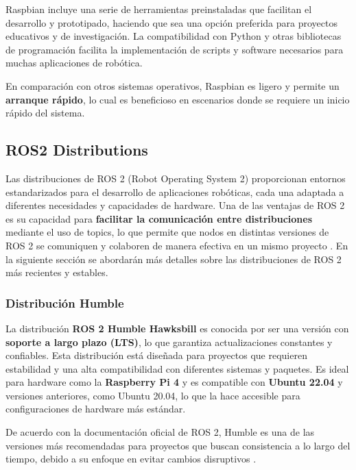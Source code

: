     Raspbian incluye una serie de herramientas preinstaladas que facilitan el desarrollo y prototipado, haciendo que sea una opción preferida para proyectos educativos y de investigación. La compatibilidad con Python y otras bibliotecas de programación facilita la implementación de scripts y software necesarios para muchas aplicaciones de robótica.

    En comparación con otros sistemas operativos, Raspbian es ligero y permite un \textbf{arranque rápido}, lo cual es beneficioso en escenarios donde se requiere un inicio rápido del sistema.


\subsection{ROS2 Distributions}
    Las distribuciones de ROS 2 (Robot Operating System 2) proporcionan entornos estandarizados para el desarrollo de aplicaciones robóticas, cada una adaptada a diferentes necesidades y capacidades de hardware. Una de las ventajas de ROS 2 es su capacidad para \textbf{facilitar la comunicación entre distribuciones} mediante el uso de topics, lo que permite que nodos en distintas versiones de ROS 2 se comuniquen y colaboren de manera efectiva en un mismo proyecto \cite{ros_docs}. En la siguiente sección se abordarán más detalles sobre las distribuciones de ROS 2 más recientes y estables.

    \subsubsection{Distribución Humble}

    La distribución \textbf{ROS 2 Humble Hawksbill} es conocida por ser una versión con \textbf{soporte a largo plazo (LTS)}, lo que garantiza actualizaciones constantes y confiables. Esta distribución está diseñada para proyectos que requieren estabilidad y una alta compatibilidad con diferentes sistemas y paquetes. Es ideal para hardware como la \textbf{Raspberry Pi 4} y es compatible con \textbf{Ubuntu 22.04} y versiones anteriores, como Ubuntu 20.04, lo que la hace accesible para configuraciones de hardware más estándar.
    
    De acuerdo con la documentación oficial de ROS 2, Humble es una de las versiones más recomendadas para proyectos que buscan consistencia a lo largo del tiempo, debido a su enfoque en evitar cambios disruptivos \cite{humble_documentation}.
    

